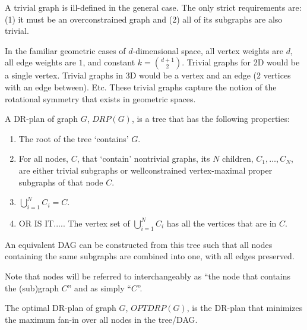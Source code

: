 \documentclass[11pt]{article}
\begin{document}
\begin{definition}
A trivial graph is ill-defined in the general case. The only strict requirements are: (1) it must be an overconstrained graph and (2) all of its subgraphs are also trivial.

In the familiar geometric cases of $d$-dimensional space, all vertex weights are $d$, all edge weights are $1$, and constant $k= {{d+1}\choose{2}}$. Trivial graphs for 2D would be a single vertex. Trivial graphs in 3D would be a vertex and an edge (2 vertices with an edge between). Etc. These trivial graphs capture the notion of the rotational symmetry that exists in geometric spaces.
\end{definition}

\begin{definition}
A DR-plan of graph $G$, $DRP(G)$, is a tree that has the following properties:
\begin{enumerate}
    \item The root of the tree `contains' $G$.
    \item For all nodes, $C$, that `contain' nontrivial graphs, its $N$ children, $C_1, \ldots, C_N$, are either trivial subgraphs or wellconstrained vertex-maximal proper subgraphs of that node $C$.
    \item $\bigcup_{i=1}^N{C_i}=C$.
    \item OR IS IT..... The vertex set of $\bigcup_{i=1}^N{C_i}$ has all the vertices that are in $C$.
\end{enumerate}


An equivalent DAG can be constructed from this tree such that all nodes containing the same subgraphs are combined into one, with all edges preserved.

Note that nodes will be referred to interchangeably as ``the node that contains the (sub)graph $C$'' and as simply ``$C$''.
\end{definition}


\begin{definition}
The optimal DR-plan of graph $G$, $OPTDRP(G)$, is the DR-plan that minimizes the maximum fan-in over all nodes in the tree/DAG.
\end{definition}
\end{document}
